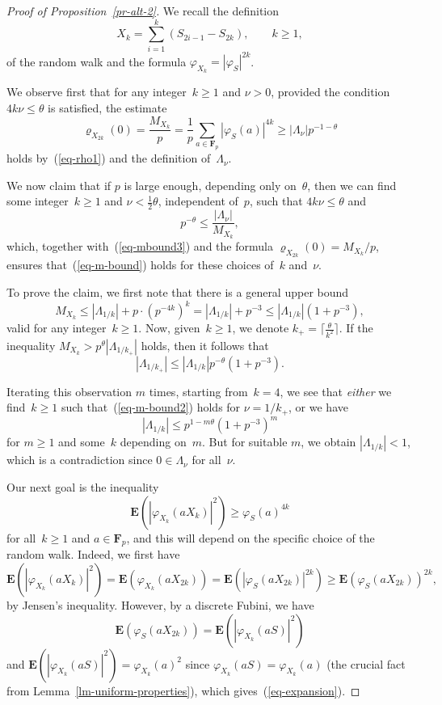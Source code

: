 \documentclass[12pt]{amsart}
\renewcommand{\leq}{\leqslant}
\renewcommand{\geq}{\geqslant}
\numberwithin{equation}{section}
\newcommand{\Ff}{\mathbf{F}}
\newcommand{\expect}{\mathbf{E}}
\renewcommand{\rho}{\varrho}
\newcommand{\demi}{{\textstyle{\frac{1}{2}}}}
\theoremstyle{plain}
\theoremstyle{remark}
\theoremstyle{definition}
\renewcommand{\geq}{\geqslant}
\renewcommand{\leq}{\leqslant}
\begin{document}
\begin{proof}[Proof of Proposition~\ref{pr-alt-2}]
We recall the definition
$$
X_k=\sum_{i=1}^k (S_{2i-1}-S_{2k}),\quad\quad k\geq 1,
$$
of the random walk and the formula $\varphi_{X_k}=|\varphi_S|^{2k}$.

We observe first that for any integer~$k\geq 1$ and $\nu>0$, provided
the condition $4k\nu\leq \theta$ is satisfied, the estimate
\begin{equation}\label{eq-mbound3}
  \rho_{X_{2k}}(0)=\frac{M_{X_k}}{p}=
  \frac{1}{p}\sum_{a\in\Ff_p}|\varphi_{S}(a)|^{4k}\geq
  |\Lambda_{\nu}|p^{-1-\theta}
\end{equation}
holds by~(\ref{eq-rho1}) and the definition of~$\Lambda_{\nu}$.

We now claim that if $p$ is large enough, depending only on~$\theta$,
then we can find some integer~$k\geq 1$ and $\nu<\demi\theta$,
independent of~$p$, such that $4k\nu\leq \theta$ and
\begin{equation}\label{eq-m-bound2}
  p^{-\theta} \leq  \frac{|\Lambda_{\nu}|}{M_{X_k}},
\end{equation}
which, together with~(\ref{eq-mbound3}) and the formula
$\rho_{X_{2k}}(0)=M_{X_k}/p$, ensures that~(\ref{eq-m-bound}) holds for
these choices of~$k$ and~$\nu$.

To prove the claim, we first note that there is a general upper bound
$$
M_{X_k}\leq |\Lambda_{1/k}|+p\cdot (p^{-4k})^k=|\Lambda_{1/k}|
+p^{-3}\leq |\Lambda_{1/k}|(1+p^{-3}),
$$
valid for any integer~$k\geq 1$.  Now, given~$k\geq 1$, we denote
$k_+=\lceil \frac{\theta}{k^2}\rceil$.  If the inequality
$M_{X_{k}}>p^{\theta}|\Lambda_{1/k_+}|$ holds, then it follows that
$$
|\Lambda_{1/k_+}|\leq |\Lambda_{1/k}|p^{-\theta}(1+p^{-3}).
$$

Iterating this observation $m$ times, starting from~$k=4$, we see that
\emph{either} we find~$k\geq 1$ such that~(\ref{eq-m-bound2}) holds for
$\nu=1/k_+$, or we have
$$
|\Lambda_{1/k}|\leq p^{1-m\theta}(1+p^{-3})^m
$$
for $m\geq 1$ and some~$k$ depending on~$m$. But for suitable $m$, we
obtain $|\Lambda_{1/k}|<1$, which is a contradiction since
$0\in\Lambda_{\nu}$ for all~$\nu$.

Our next goal is the inequality
\begin{equation}\label{eq-expansion}
  \expect(|\varphi_{X_k}(a X_k)|^2)\geq \varphi_{S}(a)^{4k}
\end{equation}
for all~$k\geq 1$ and $a\in\Ff_p$, and this will depend on the specific
choice of the random walk. Indeed, we first have
$$
\expect(|\varphi_{X_k}(a X_k)|^2)= \expect(\varphi_{X_k}(a
X_{2k}))=\expect(|\varphi_S (a X_{2k})|^{2k}) \geq \expect(\varphi_S(a
X_{2k}))^{2k},
$$
by Jensen's inequality. However, by a discrete Fubini, we have
$$
\expect(\varphi_S(a X_{2k}))=\expect(|\varphi_{X_{k}}(a
S)|^2)
$$
and $\expect(|\varphi_{X_k}(a S)|^2)=\varphi_{X_k}(a)^2$ since
$\varphi_{X_k}(a S)=\varphi_{X_k}(a)$ (the crucial fact from
Lemma~\ref{lm-uniform-properties}), which gives~(\ref{eq-expansion}).


\end{proof}
\end{document}
